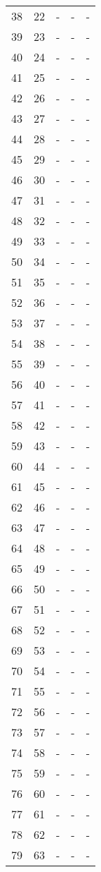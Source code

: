 \documentclass[10pt]{article}
\begin{document}
\begin {longtable}{l r r r r}
38 & 22 & - & - & - \\
39 & 23 & - & - & - \\
40 & 24 & - & - & - \\
41 & 25 & - & - & - \\
42 & 26 & - & - & - \\
43 & 27 & - & - & - \\
44 & 28 & - & - & - \\
45 & 29 & - & - & - \\
46 & 30 & - & - & - \\
47 & 31 & - & - & - \\
48 & 32 & - & - & - \\
49 & 33 & - & - & - \\
50 & 34 & - & - & - \\
51 & 35 & - & - & - \\
52 & 36 & - & - & - \\
53 & 37 & - & - & - \\
54 & 38 & - & - & - \\
55 & 39 & - & - & - \\
56 & 40 & - & - & - \\
57 & 41 & - & - & - \\
58 & 42 & - & - & - \\
59 & 43 & - & - & - \\
60 & 44 & - & - & - \\
61 & 45 & - & - & - \\
62 & 46 & - & - & - \\
63 & 47 & - & - & - \\
64 & 48 & - & - & - \\
65 & 49 & - & - & - \\
66 & 50 & - & - & - \\
67 & 51 & - & - & - \\
68 & 52 & - & - & - \\
69 & 53 & - & - & - \\
70 & 54 & - & - & - \\
71 & 55 & - & - & - \\
72 & 56 & - & - & - \\
73 & 57 & - & - & - \\
74 & 58 & - & - & - \\
75 & 59 & - & - & - \\
76 & 60 & - & - & - \\
77 & 61 & - & - & - \\
78 & 62 & - & - & - \\
79 & 63 & - & - & - \\

\end{longtable}
\end{document}

